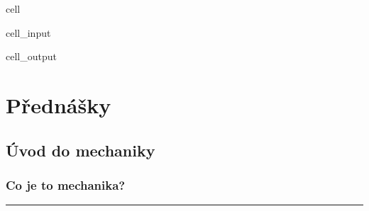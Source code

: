 \documentclass[letterpaper,10pt,english]{jupyterBook}
\begin{document}
\begin{sphinxuseclass}{cell}\begin{sphinxVerbatimInput}

\begin{sphinxuseclass}{cell_input}
\begin{sphinxVerbatim}[commandchars=\\\{\}]
   

 
\end{sphinxVerbatim}

\end{sphinxuseclass}\end{sphinxVerbatimInput}
\begin{sphinxVerbatimOutput}

\begin{sphinxuseclass}{cell_output}
\noindent{}

\end{sphinxuseclass}\end{sphinxVerbatimOutput}

\end{sphinxuseclass}
\sphinxstepscope


\part{Přednášky}

\sphinxstepscope


\chapter{Úvod do mechaniky}
\label{\detokenize{Prednasky/0_1_Definice_a_historie_mechaniky:uvod-do-mechaniky}}\label{\detokenize{Prednasky/0_1_Definice_a_historie_mechaniky::doc}}

\section{Co je to mechanika?}
\label{\detokenize{Prednasky/0_1_Definice_a_historie_mechaniky:co-je-to-mechanika}}

\bigskip\hrule\bigskip

\begin{quote}


\end{quote}
\end{document}
